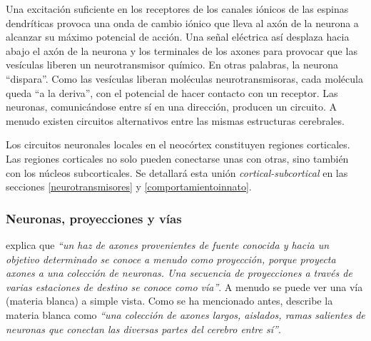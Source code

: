 Una excitación suficiente en los receptores de los canales iónicos de las espinas dendríticas provoca una onda de cambio iónico que lleva al axón de la neurona a alcanzar su máximo potencial de acción. Una señal eléctrica así desplaza hacia abajo el axón de la neurona y los terminales de los axones para provocar que las vesículas liberen un neurotransmisor químico. En otras palabras, la neurona ``dispara''. Como las vesículas liberan moléculas neurotransmisoras, cada molécula queda ``a la deriva'', con el potencial de hacer contacto con un receptor. Las neuronas, comunicándose entre sí en una dirección, producen un circuito. A menudo existen circuitos alternativos entre las mismas estructuras cerebrales.

Los circuitos neuronales locales en el neocórtex constituyen regiones corticales. Las regiones corticales no solo pueden conectarse unas con otras, sino también con los núcleos subcorticales. Se detallará esta unión {\it cortical-subcortical} en las secciones  \ref{neurotransmisores} y \ref{comportamientoinnato}.


\subsubsection{Neuronas, proyecciones y vías}

\cite{Damasio1994} explica que {\it ``un haz de axones provenientes de fuente conocida y hacia un objetivo determinado se conoce a menudo como proyección, porque proyecta axones a una colección de neuronas. Una secuencia de proyecciones a través de varias estaciones de destino se conoce como vía''}. A menudo se puede ver una vía (materia blanca) a simple vista. Como se ha mencionado antes, \cite{Czerner2001} describe la materia blanca como {\it ``una colección de axones largos, aislados, ramas salientes de neuronas que conectan las diversas partes del cerebro entre sí''}.



